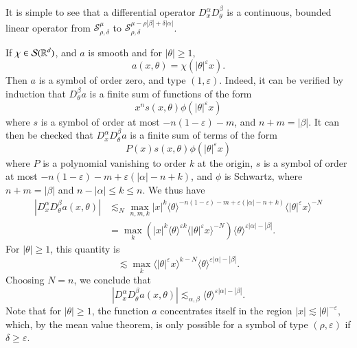 \begin{example}
\end{example}

It is simple to see that a differential operator $D^\alpha_x D^\beta_\theta$ is a continuous, bounded linear operator from $\mathcal{S}^\mu_{\rho,\delta}$ to $\mathcal{S}^{\mu - \rho |\beta| + \delta |\alpha|}_{\rho,\delta}$.

\begin{example}
    If $\chi \in \mathcal{S}(\operatorname{\mathbb{R}}^d)$, and $a$ is smooth and for $|\theta| \geq 1$,
    \[ a(x,\theta) = \chi \left( |\theta|^\varepsilon x \right). \]
    Then $a$ is a symbol of order zero, and type $(1,\varepsilon)$. Indeed, it can be verified by induction that $D^\beta_\theta a$ is a finite sum of functions of the form
    \[ x^n s(x,\theta) \phi( |\theta|^\varepsilon x ) \]
    where $s$ is a symbol of order at most $-n(1 - \varepsilon) - m$, and $n + m = |\beta|$. It can then be checked that $D^\alpha_x D^\beta_\theta a$ is a finite sum of terms of the form
    \[ P(x) s(x,\theta) \phi( |\theta|^\varepsilon x ) \]
    where $P$ is a polynomial vanishing to order $k$ at the origin, $s$ is a symbol of order at most $-n(1 - \varepsilon) - m + \varepsilon ( |\alpha| - n + k )$, and $\phi$ is Schwartz, where $n + m = |\beta|$ and $n - |\alpha| \leq k \leq n$. We thus have
    \begin{align*}
        |D^\alpha_x D^\beta_\theta a(x,\theta)| &\lesssim_N \max_{n,m,k} |x|^k \langle \theta \rangle^{-n(1 - \varepsilon) - m + \varepsilon (|\alpha| - n + k)} \langle |\theta|^\varepsilon x \rangle^{-N}\\
        &= \max_k \left( |x|^k \langle \theta \rangle^{\varepsilon k} \langle |\theta|^\varepsilon x \rangle^{-N} \right) \langle \theta \rangle^{\varepsilon |\alpha| - |\beta|}.
    \end{align*}
    For $|\theta| \geq 1$, this quantity is
    \[ \lesssim \max_k \langle |\theta|^\varepsilon x \rangle^{k-N} \langle \theta \rangle^{\varepsilon |\alpha| - |\beta|}. \]
    Choosing $N = n$, we conclude that
    \[ |D^\alpha_x D^\beta_\theta a(x,\theta)| \lesssim_{\alpha,\beta} \langle \theta \rangle^{\varepsilon |\alpha| - |\beta|}. \]
    Note that for $|\theta| \geq 1$, the function $a$ concentrates itself in the region $|x| \lesssim |\theta|^{-\varepsilon}$, which, by the mean value theorem, is only possible for a symbol of type $(\rho,\varepsilon)$ if $\delta \geq \varepsilon$.
\end{example}

